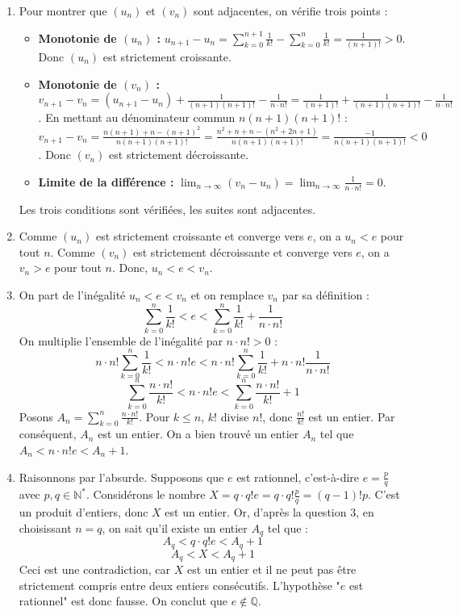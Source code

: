 \documentclass[solutions]{exercices}
\begin{document}
\begin{solution}
	\begin{enumerate}
		\item Pour montrer que $(u_n)$ et $(v_n)$ sont adjacentes, on vérifie trois points :
		      \begin{itemize}
			      \item \textbf{Monotonie de $(u_n)$ :} $u_{n+1}-u_n = \sum_{k=0}^{n+1} \frac{1}{k!} - \sum_{k=0}^{n} \frac{1}{k!} = \frac{1}{(n+1)!} > 0$. Donc $(u_n)$ est strictement croissante.
			      \item \textbf{Monotonie de $(v_n)$ :}
			            $v_{n+1}-v_n = (u_{n+1}-u_n) + \frac{1}{(n+1)(n+1)!} - \frac{1}{n \cdot n!} = \frac{1}{(n+1)!} + \frac{1}{(n+1)(n+1)!} - \frac{1}{n \cdot n!}$.
			            En mettant au dénominateur commun $n(n+1)(n+1)!$ :
			            $v_{n+1}-v_n = \frac{n(n+1) + n - (n+1)^2}{n(n+1)(n+1)!} = \frac{n^2+n+n - (n^2+2n+1)}{n(n+1)(n+1)!} = \frac{-1}{n(n+1)(n+1)!} < 0$.
			            Donc $(v_n)$ est strictement décroissante.
			      \item \textbf{Limite de la différence :} $\lim_{n\to\infty} (v_n - u_n) = \lim_{n\to\infty} \frac{1}{n \cdot n!} = 0$.
		      \end{itemize}
		      Les trois conditions sont vérifiées, les suites sont adjacentes.
		\item Comme $(u_n)$ est strictement croissante et converge vers $e$, on a $u_n < e$ pour tout $n$.
		      Comme $(v_n)$ est strictement décroissante et converge vers $e$, on a $v_n > e$ pour tout $n$.
		      Donc, $u_n < e < v_n$.
		\item On part de l'inégalité $u_n < e < v_n$ et on remplace $v_n$ par sa définition :
		      \[ \sum_{k=0}^{n} \frac{1}{k!} < e < \sum_{k=0}^{n} \frac{1}{k!} + \frac{1}{n \cdot n!} \]
		      On multiplie l'ensemble de l'inégalité par $n \cdot n! > 0$ :
		      \[ n \cdot n! \sum_{k=0}^{n} \frac{1}{k!} < n \cdot n! e < n \cdot n! \sum_{k=0}^{n} \frac{1}{k!} + n \cdot n! \frac{1}{n \cdot n!} \]
		      \[ \sum_{k=0}^{n} \frac{n \cdot n!}{k!} < n \cdot n! e < \sum_{k=0}^{n} \frac{n \cdot n!}{k!} + 1 \]
		      Posons $A_n = \sum_{k=0}^{n} \frac{n \cdot n!}{k!}$. Pour $k \le n$, $k!$ divise $n!$, donc $\frac{n!}{k!}$ est un entier. Par conséquent, $A_n$ est un entier. On a bien trouvé un entier $A_n$ tel que $A_n < n \cdot n! e < A_n + 1$.
		\item Raisonnons par l'absurde. Supposons que $e$ est rationnel, c'est-à-dire $e = \frac{p}{q}$ avec $p, q \in \mathbb{N}^*$.
		      Considérons le nombre $X = q \cdot q! e = q \cdot q! \frac{p}{q} = (q-1)! p$. C'est un produit d'entiers, donc $X$ est un entier.
		      Or, d'après la question 3, en choisissant $n=q$, on sait qu'il existe un entier $A_q$ tel que :
		      \[ A_q < q \cdot q! e < A_q + 1 \]
		      \[ A_q < X < A_q + 1 \]
		      Ceci est une contradiction, car $X$ est un entier et il ne peut pas être strictement compris entre deux entiers consécutifs.
		      L'hypothèse "$e$ est rationnel" est donc fausse. On conclut que $e \notin \mathbb{Q}$.
	\end{enumerate}
\end{solution}
\end{document}
